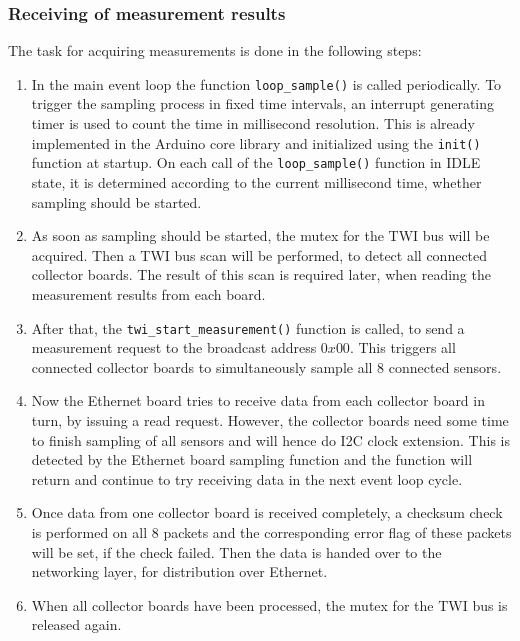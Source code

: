 \documentclass[a4paper]{scrreprt}
\begin{document}
\subsubsection{Receiving of measurement results}
The task for acquiring measurements is done in the following steps:
\begin{enumerate}
  \item In the main event loop the function \texttt{loop\_sample()} is called periodically. To trigger the sampling process in fixed time
    intervals, an interrupt generating timer is used to count the time in millisecond resolution. This is already implemented in the Arduino core library
    and initialized using the \texttt{init()} function at startup.
    On each call of the \texttt{loop\_sample()} function in IDLE state, it is determined according to the current millisecond time,
    whether sampling should be started.
  \item As soon as sampling should be started, the mutex for the TWI bus will be acquired. Then a TWI bus scan will be performed, to detect
    all connected collector boards. The result of this scan is required later, when reading the measurement results from each board.
  \item After that, the \texttt{twi\_start\_measurement()} function is called, to send a measurement request to the broadcast address $0x00$.
    This triggers all connected collector
    boards to simultaneously sample all 8 connected sensors.
  \item Now the Ethernet board tries to receive data from each collector board in turn, by issuing a read request. However, the collector boards
    need some time to finish sampling of all sensors and will hence do I2C clock extension. This is detected by the Ethernet board
    sampling function and the function will return and continue to try receiving data in the next event loop cycle.
  \item Once data from one collector board is received completely, a checksum check is performed on all 8 packets and the corresponding error flag of these packets will be set, if the check failed. Then the data is
    handed over to the networking layer, for distribution over Ethernet.
  \item When all collector boards have been processed, the mutex for the TWI bus is released again.
\end{enumerate}
\end{document}
